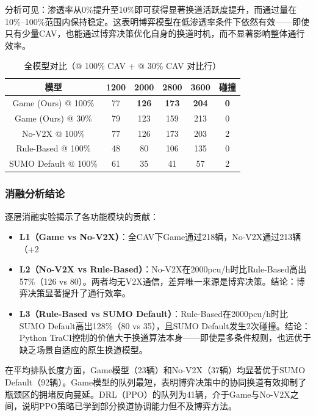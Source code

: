 分析可见：渗透率从0\%提升至10\%即可获得显著换道活跃度提升，而通过量在10\%--100\%范围内保持稳定。这表明博弈模型在低渗透率条件下依然有效——即使只有少量CAV，也能通过博弈决策优化自身的换道时机，而不显著影响整体通行效率。

\begin{table}[H]
\centering
\caption{全模型对比（@ 100\% CAV + @ 30\% CAV 对比行）}
\label{tab:model_comparison}
\small
\begin{tabular}{c|cccc|c}
\hline
模型 & 1200 & 2000 & 2800 & 3600 & 碰撞 \\
\hline
Game (Ours) @ 100\% & 77 & \textbf{126} & \textbf{173} & \textbf{204} & \textbf{0} \\
Game (Ours) @ 30\%  & 79 & 123 & 159 & 213 & 0 \\
No-V2X @ 100\%      & 77 & 126 & 173 & 203 & 2 \\
Rule-Based @ 100\%  & 48 & 80 & 106 & 135 & 0 \\
SUMO Default @ 100\% & 61 & 35 & 41 & 57 & 2 \\
\hline
\end{tabular}
\end{table}

\subsubsection{消融分析结论}
逐层消融实验揭示了各功能模块的贡献：

\begin{itemize}
    \item \textbf{L1（Game vs No-V2X）}：全CAV下Game通过218辆，No-V2X通过213辆（+2%
    \item \textbf{L2（No-V2X vs Rule-Based）}：No-V2X在2000pcu/h时比Rule-Based高出57\%（126 vs 80）。两者均无V2X通信，差异唯一来源是博弈决策。结论：博弈决策显著提升了通行效率。
    \item \textbf{L3（Rule-Based vs SUMO Default）}：Rule-Based在2000pcu/h时比SUMO Default高出128\%（80 vs 35），且SUMO Default发生2次碰撞。结论：Python TraCI控制的价值大于换道算法本身——即使是多条件规则，也远优于缺乏场景自适应的原生换道模型。
\end{itemize}

在平均排队长度方面，Game模型（23辆）和No-V2X（37辆）均显著优于SUMO Default（92辆）。Game模型的队列最短，表明博弈决策中的协同换道有效抑制了瓶颈区的拥堵反向蔓延。DRL（PPO）的队列为41辆，介于Game与No-V2X之间，说明PPO策略已学到部分换道协调能力但不及博弈方法。

